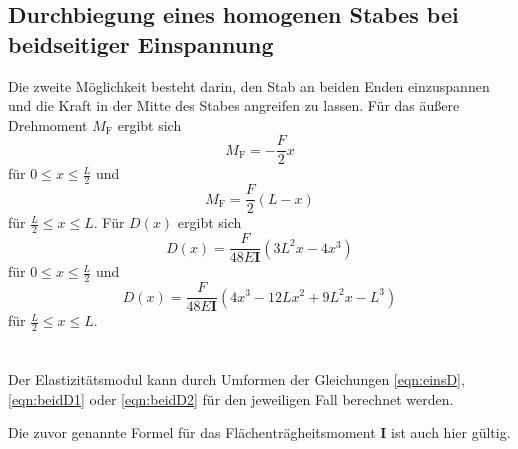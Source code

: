 
\subsection{Durchbiegung eines homogenen Stabes bei beidseitiger Einspannung} \label{sec:beidseitig}

    Die zweite Möglichkeit besteht darin, den Stab an beiden Enden einzuspannen und die Kraft in der
    Mitte des Stabes angreifen zu lassen.
    Für das äußere Drehmoment $M_\text{F}$ ergibt sich
    \begin{equation}
        M_\text{F} = - \frac{F}{2} x
    \end{equation}
    für $0 \leq x \leq \frac{L}{2}$ und
    \begin{equation}
        M_\text{F} = \frac{F}{2} (L-x)
    \end{equation}
    für $\frac{L}{2} \leq x \leq L$.
    Für $D(x)$ ergibt sich
    \begin{equation}
        D(x) = \frac{F}{48E\mathbf{I}} (3L^2 x - 4x^3) \label{eqn:beidD1}
    \end{equation}
    für $0 \leq x \leq \frac{L}{2}$ und
    \begin{equation}
        D(x) = \frac{F}{48E\mathbf{I}} (4x^3 - 12Lx^2 + 9L^2 x - L^3) \label{eqn:beidD2}
    \end{equation}
    für $\frac{L}{2} \leq x \leq L$. \\ \\ \\

Der Elastizitätsmodul kann durch Umformen der Gleichungen \eqref{eqn:einsD}, \eqref{eqn:beidD1} oder \eqref{eqn:beidD2}
für den jeweiligen Fall berechnet werden.

Die zuvor genannte Formel für das Flächenträgheitsmoment $\mathbf{I}$ ist auch hier gültig.

